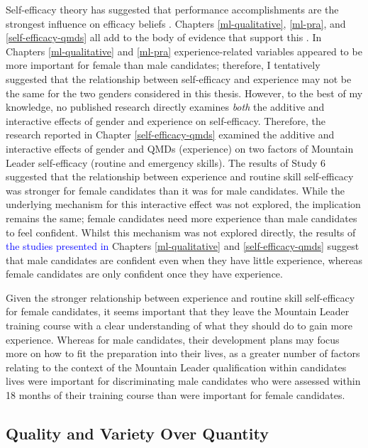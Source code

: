 \documentclass[
  12pt,
  a4paper,
]{book}
\begin{document}
Self-efficacy theory has suggested that performance accomplishments are the strongest influence on efficacy beliefs \citep{Bandura1982}. Chapters \ref{ml-qualitative}, \ref{ml-pra}, and \ref{self-efficacy-qmds} all add to the body of evidence that support this \citep[e.g.,][]{Chase2003, Samson2014, Shipherd2019}. In Chapters \ref{ml-qualitative} and \ref{ml-pra} experience-related variables appeared to be more important for female than male candidates; therefore, I tentatively suggested that the relationship between self-efficacy and experience may not be the same for the two genders considered in this thesis. However, to the best of my knowledge, no published research directly examines \emph{both} the additive and interactive effects of gender and experience on self-efficacy. Therefore, the research reported in Chapter \ref{self-efficacy-qmds} examined the additive and interactive effects of gender and QMDs (experience) on two factors of Mountain Leader self-efficacy (routine and emergency skills). The results of Study 6 suggested that the relationship between experience and routine skill self-efficacy was stronger for female candidates than it was for male candidates. While the underlying mechanism for this interactive effect was not explored, the implication remains the same; female candidates need more experience than male candidates to feel confident. Whilst this mechanism was not explored directly, the results of \textcolor{blue}{the studies presented in} Chapters \ref{ml-qualitative} and \ref{self-efficacy-qmds} suggest that male candidates are confident even when they have little experience, whereas female candidates are only confident once they have experience.

Given the stronger relationship between experience and routine skill self-efficacy for female candidates, it seems important that they leave the Mountain Leader training course with a clear understanding of what they should do to gain more experience. Whereas for male candidates, their development plans may focus more on how to fit the preparation into their lives, as a greater number of factors relating to the context of the Mountain Leader qualification within candidates lives were important for discriminating male candidates who were assessed within 18 months of their training course than were important for female candidates.

\hypertarget{quality-and-variety-over-quantity}{%
\subsection{Quality and Variety Over Quantity}\label{quality-and-variety-over-quantity}}
\end{document}
